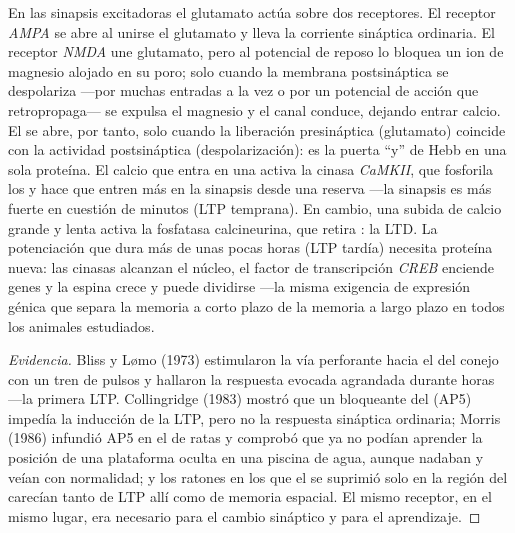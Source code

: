 \begin{proposition}\label{prop:b3:learning-memory:nmda}
En las sinapsis excitadoras el glutamato actúa sobre dos receptores. El
receptor \emph{AMPA} se abre al unirse el glutamato y lleva la
corriente sináptica ordinaria. El receptor \emph{NMDA} une glutamato,
pero al potencial de reposo lo bloquea un ion de magnesio alojado en su
poro; solo cuando la membrana postsináptica se despolariza ---por
muchas entradas a la vez o por un potencial de acción que
retropropaga--- se expulsa el magnesio y el canal conduce, dejando
entrar calcio. El  se abre, por tanto, solo cuando la
liberación presináptica (glutamato) coincide con la actividad
postsináptica (despolarización): es la puerta ``y'' de Hebb en una sola
proteína. El calcio que entra en una \emph{} activa la
cinasa \emph{CaMKII}, que fosforila los  y hace que
entren más en la sinapsis desde una reserva ---la sinapsis es más
fuerte en cuestión de minutos (LTP temprana). En cambio, una subida de
calcio grande y lenta activa la fosfatasa calcineurina, que retira
: la LTD. La potenciación que dura más de unas pocas
horas (LTP tardía) necesita proteína nueva: las cinasas alcanzan el
núcleo, el factor de transcripción \emph{CREB} enciende genes y la
espina crece y puede dividirse ---la misma exigencia de expresión
génica que separa la memoria a corto plazo de la memoria a largo plazo
en todos los animales estudiados.
\end{proposition}

\begin{proof}[Evidencia]
Bliss y L\o mo (1973) estimularon la vía perforante hacia el 
del conejo con un tren de pulsos y hallaron la respuesta evocada
agrandada durante horas ---la primera LTP. Collingridge (1983) mostró
que un bloqueante del  (AP5) impedía la inducción de la
LTP, pero no la respuesta sináptica ordinaria; Morris (1986) infundió
AP5 en el  de ratas y comprobó que ya no podían aprender la
posición de una plataforma oculta en una piscina de agua, aunque
nadaban y veían con normalidad; y los ratones en los que el  se suprimió solo en la región  del  carecían tanto de
LTP allí como de memoria espacial. El mismo receptor, en el mismo
lugar, era necesario para el cambio sináptico y para el aprendizaje.
\end{proof}

